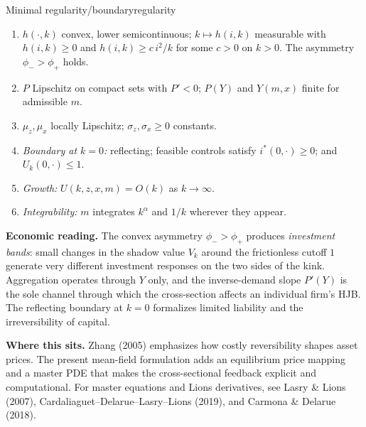 ﻿\documentclass[11pt,letterpaper,oneside]{article}
\numberwithin{equation}{section}
\newcommand{\1}{\mathbf{1}}
\begin{document}
\begin{assumption}{Minimal regularity/boundary}{regularity}
\begin{enumerate}[label=(\alph*),itemsep=0.2em]
\item $h(\cdot,k)$ convex, lower semicontinuous; $k\mapsto h(i,k)$ measurable with $h(i,k)\ge 0$ and $h(i,k)\ge c\,i^2/k$ for some $c>0$ on $k>0$. The asymmetry $\phi_->\phi_+$ holds.
\item $P$ Lipschitz on compact sets with $P'<0$; $P(Y)$ and $Y(m,x)$ finite for admissible $m$.
\item $\mu_z,\mu_x$ locally Lipschitz; $\sigma_z,\sigma_x\ge 0$ constants.
\item \emph{Boundary at $k=0$:} reflecting; feasible controls satisfy $i^*(0,\cdot)\ge 0$; and $U_k(0,\cdot)\le 1$.
\item \emph{Growth:} $U(k,z,x,m)=O(k)$ as $k\to\infty$.
\item \emph{Integrability:} $m$ integrates $k^\alpha$ and $1/k$ wherever they appear.
\end{enumerate}
\end{assumption}

\begin{tcolorbox}[didacticstyle]
\textbf{Economic reading.} The convex asymmetry $\phi_->\phi_+$ produces \emph{investment bands}: small changes in the shadow value $V_k$ around the frictionless cutoff $1$ generate very different investment responses on the two sides of the kink. Aggregation operates through $Y$ only, and the inverse-demand slope $P'(Y)$ is the sole channel through which the cross-section affects an individual firm's HJB. The reflecting boundary at $k=0$ formalizes limited liability and the irreversibility of capital.
\end{tcolorbox}


\begin{tcolorbox}[literaturestyle]
\textbf{Where this sits.} Zhang (2005) emphasizes how costly reversibility shapes asset prices. The present mean-field formulation adds an equilibrium price mapping and a master PDE that makes the cross-sectional feedback explicit and computational. For master equations and Lions derivatives, see Lasry \& Lions (2007), Cardaliaguet--Delarue--Lasry--Lions (2019), and Carmona \& Delarue (2018).
\end{tcolorbox}

\end{document}
